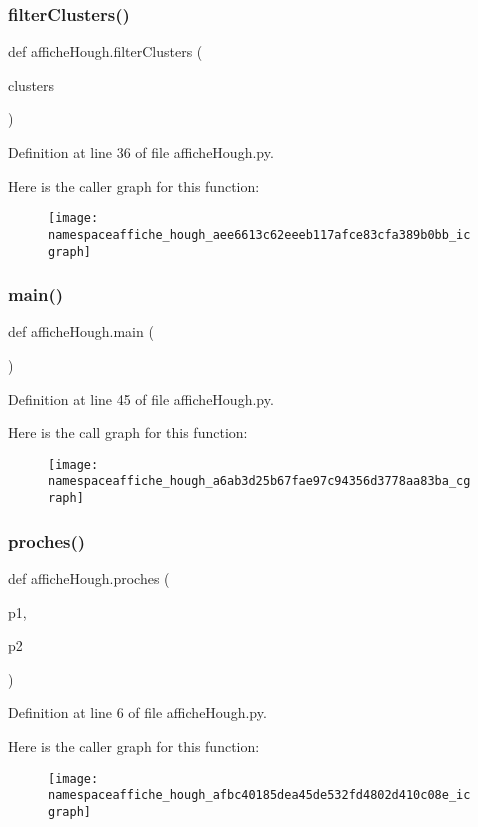 \subsubsection{\texorpdfstring{filter\+Clusters()}{filterClusters()}}
{\footnotesize\ttfamily def affiche\+Hough.\+filter\+Clusters (\begin{DoxyParamCaption}\item[{}]{clusters }\end{DoxyParamCaption})}



Definition at line 36 of file affiche\+Hough.\+py.

Here is the caller graph for this function\+:\nopagebreak
\begin{figure}[H]
\begin{center}
\leavevmode
\texttt{[image: namespaceaffiche\_hough\_aee6613c62eeeb117afce83cfa389b0bb\_icgraph]}
\end{center}
\end{figure}
\mbox{\label{namespaceaffiche_hough_a6ab3d25b67fae97c94356d3778aa83ba}} 
\subsubsection{\texorpdfstring{main()}{main()}}
{\footnotesize\ttfamily def affiche\+Hough.\+main (\begin{DoxyParamCaption}{ }\end{DoxyParamCaption})}



Definition at line 45 of file affiche\+Hough.\+py.

Here is the call graph for this function\+:\nopagebreak
\begin{figure}[H]
\begin{center}
\leavevmode
\texttt{[image: namespaceaffiche\_hough\_a6ab3d25b67fae97c94356d3778aa83ba\_cgraph]}
\end{center}
\end{figure}
\mbox{\label{namespaceaffiche_hough_afbc40185dea45de532fd4802d410c08e}} 
\subsubsection{\texorpdfstring{proches()}{proches()}}
{\footnotesize\ttfamily def affiche\+Hough.\+proches (\begin{DoxyParamCaption}\item[{}]{p1,  }\item[{}]{p2 }\end{DoxyParamCaption})}



Definition at line 6 of file affiche\+Hough.\+py.

Here is the caller graph for this function\+:\nopagebreak
\begin{figure}[H]
\begin{center}
\leavevmode
\texttt{[image: namespaceaffiche\_hough\_afbc40185dea45de532fd4802d410c08e\_icgraph]}
\end{center}
\end{figure}

